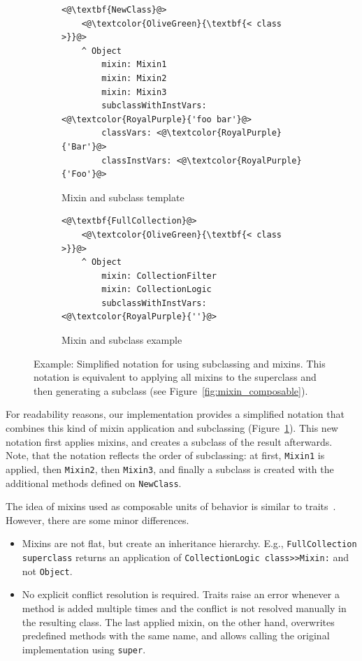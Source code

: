\begin{figure}[!htp]
\begin{subfigure}[b]{0.45\textwidth}
\begin{lstlisting}
<@\textbf{NewClass}@>
    <@\textcolor{OliveGreen}{\textbf{< class >}}@>
    ^ Object
        mixin: Mixin1
        mixin: Mixin2
        mixin: Mixin3
        subclassWithInstVars: <@\textcolor{RoyalPurple}{'foo bar'}@>
        classVars: <@\textcolor{RoyalPurple}{'Bar'}@>
        classInstVars: <@\textcolor{RoyalPurple}{'Foo'}@>
\end{lstlisting}
\caption{Mixin and subclass template}
\end{subfigure}
\qquad
\begin{subfigure}[b]{0.45\textwidth}
\begin{lstlisting}
<@\textbf{FullCollection}@>
    <@\textcolor{OliveGreen}{\textbf{< class >}}@>
    ^ Object
        mixin: CollectionFilter
        mixin: CollectionLogic
        subclassWithInstVars: <@\textcolor{RoyalPurple}{''}@>
\end{lstlisting}
\caption{Mixin and subclass example}
\end{subfigure}
\caption[Example: Simplified notation for using subclassing and mixins]{Example: Simplified notation for using subclassing and mixins. This notation is equivalent to applying all mixins to the superclass and then generating a subclass (see Figure~\ref{fig:mixin_composable}).}
\label{fig:usecase_subcl_mixin}
\end{figure}

For readability reasons, our implementation provides a simplified notation that combines this kind of mixin application and subclassing (Figure~\ref{fig:usecase_subcl_mixin}). This new notation first applies mixins, and creates a subclass of the result afterwards. Note, that the notation reflects the order of subclassing: at first, \texttt{Mixin1} is applied, then \texttt{Mixin2}, then \texttt{Mixin3}, and finally a subclass is created with the additional methods defined on \texttt{NewClass}.

The idea of mixins used as composable units of behavior is similar to traits~\cite{traitsschaerli}. However, there are some minor differences.
\begin{itemize}
    \item Mixins are not flat, but create an inheritance hierarchy. E.g., \texttt{FullCollection superclass} returns an application of \texttt{CollectionLogic class>>Mixin:} and not \texttt{Object}.
    \item No explicit conflict resolution is required. Traits raise an error whenever a method is added multiple times and the conflict is not resolved manually in the resulting class. The last applied mixin, on the other hand, overwrites predefined methods with the same name, and allows calling the original implementation using \texttt{super}.
\end{itemize}


